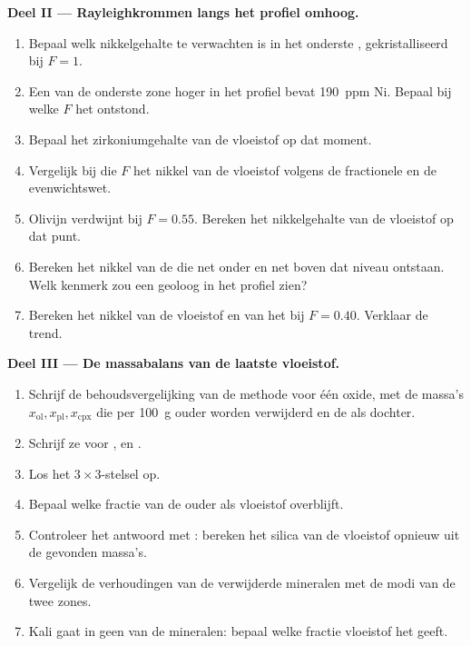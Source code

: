 \begin{problem}
\noindent\textbf{Deel II --- Rayleighkrommen langs het profiel omhoog.}
\begin{enumerate}[resume]
\item Bepaal welk nikkelgehalte te verwachten is in het onderste , gekristalliseerd bij
$F = 1$.
\item Een  van de onderste zone hoger in het profiel bevat \qty{190}{ppm} Ni. Bepaal bij welke $F$ het
ontstond.
\item Bepaal het zirkoniumgehalte van de vloeistof op dat moment.
\item Vergelijk bij die $F$ het nikkel van de vloeistof volgens de fractionele en de
evenwichtswet.
\item Olivijn verdwijnt bij $F = 0.55$. Bereken het nikkelgehalte van de vloeistof
op dat punt.
\item Bereken het nikkel van de  die net onder en net boven dat
niveau ontstaan. Welk kenmerk zou een geoloog in het profiel zien?
\item Bereken het nikkel van de vloeistof en van het  bij $F = 0.40$. Verklaar
de trend.
\end{enumerate}

\noindent\textbf{Deel III --- De massabalans van de laatste vloeistof.}
\begin{enumerate}[resume]
\item Schrijf de behoudsvergelijking van de methode voor één oxide, met de massa's
$x_{\mathrm{ol}}, x_{\mathrm{pl}}, x_{\mathrm{cpx}}$ die per \qty{100}{g}
ouder worden verwijderd en de  als dochter.
\item Schrijf ze voor ,  en .
\item Los het $3 \times 3$-stelsel op.
\item Bepaal welke fractie van de ouder als vloeistof overblijft.
\item Controleer het antwoord met : bereken het silica van de vloeistof opnieuw uit de
gevonden massa's.
\item Vergelijk de verhoudingen van de verwijderde mineralen met de modi van de twee
zones.
\item Kali gaat in geen van de mineralen: bepaal welke fractie vloeistof het geeft.
\end{enumerate}


\end{problem}
